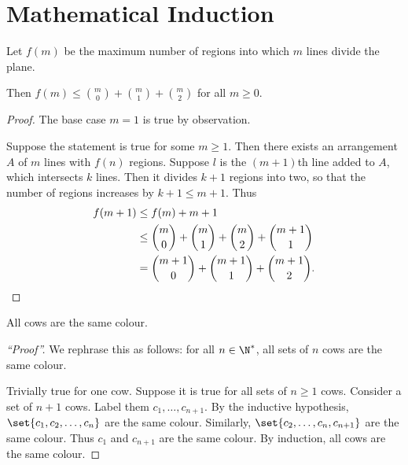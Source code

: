 \section{Mathematical Induction} \label{sec:induction}
\begin{example}
    Let $f(m)$ be the maximum number of regions into which $m$ lines divide
    the plane.
    \begin{center}
    \end{center}
    Then $f(m) \le \binom{m}{0} + \binom{m}{1} + \binom{m}{2}$ for all
    $m \ge 0$.
\end{example}
\begin{proof}
    The base case $m = 1$ is true by observation.

    Suppose the statement is true for some $m \ge 1$.
    Then there exists an arrangement $A$ of $m$ lines with $f(n)$ regions.
    Suppose $l$ is the $(m+1)$th line added to $A$, which intersects $k$
    lines.
    Then it divides $k+1$ regions into two, so that the number of regions
    increases by $k+1 \le m+1$.
    Thus \begin{align*}
        f(m+1) &\le f(m) + m + 1 \\
            &\le \binom{m}{0} + \binom{m}{1} + \binom{m}{2} + \binom{m+1}{1} \\
            &= \binom{m+1}{0} + \binom{m+1}{1} + \binom{m+1}{2}. \qedhere
    \end{align*}
\end{proof}

\begin{example}[Wrong]
    All cows are the same colour.
\end{example}
\begin{proof}[``Proof'']
    We rephrase this as follows: for all $n \in \N^*$, all sets of $n$ cows
    are the same colour.

    Trivially true for one cow.
    Suppose it is true for all sets of $n \ge 1$ cows.
    Consider a set of $n+1$ cows.
    Label them $c_1, \dots, c_{n+1}$.
    By the inductive hypothesis, $\set{c_1, c_2, \dots, c_n}$ are the same
    colour.
    Similarly, $\set{c_2, \dots, c_n, c_{n+1}}$ are the same colour.
    Thus $c_1$ and $c_{n+1}$ are the same colour.
    By induction, all cows are the same colour.
\end{proof}
